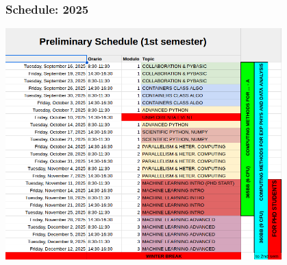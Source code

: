 \documentclass[9pt]{beamer}
\begin{document}
\begin{frame}
  \frametitle{Schedule: 2025}
  \centering\includegraphics[width=0.8\textwidth]{figures/calendar_2025}
\end{frame}
\end{document}
